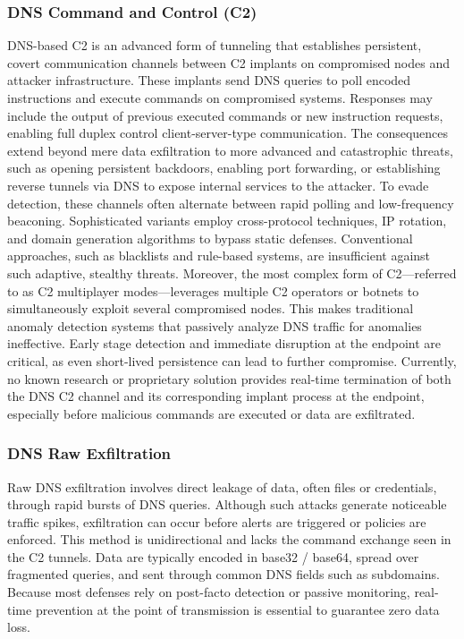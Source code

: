 \documentclass [11pt, proquest] {uwthesis}[2020/02/24]
\begin{document}
\subsubsection{DNS Command and Control (C2)}
DNS-based C2 is an advanced form of tunneling that establishes persistent, covert communication channels between C2 implants on compromised nodes and attacker infrastructure. These implants send DNS queries to poll encoded instructions and execute commands on compromised systems. Responses may include the output of previous executed commands or new instruction requests, enabling full duplex control client-server-type communication. The consequences extend beyond mere data exfiltration to more advanced and catastrophic threats, such as opening persistent backdoors, enabling port forwarding, or establishing reverse tunnels via DNS to expose internal services to the attacker. To evade detection, these channels often alternate between rapid polling and low-frequency beaconing. Sophisticated variants employ cross-protocol techniques, IP rotation, and domain generation algorithms to bypass static defenses. Conventional approaches, such as blacklists and rule-based systems, are insufficient against such adaptive, stealthy threats. Moreover, the most complex form of C2—referred to as C2 multiplayer modes—leverages multiple C2 operators or botnets to simultaneously exploit several compromised nodes. This makes traditional anomaly detection systems that passively analyze DNS traffic for anomalies ineffective. Early stage detection and immediate disruption at the endpoint are critical, as even short-lived persistence can lead to further compromise. Currently, no known research or proprietary solution provides real-time termination of both the DNS C2 channel and its corresponding implant process at the endpoint, especially before malicious commands are executed or data are exfiltrated.


\subsubsection{DNS Raw Exfiltration}
Raw DNS exfiltration involves direct leakage of data, often files or credentials, through rapid bursts of DNS queries. Although such attacks generate noticeable traffic spikes, exfiltration can occur before alerts are triggered or policies are enforced.
This method is unidirectional and lacks the command exchange seen in the C2 tunnels. Data are typically encoded in base32 / base64, spread over fragmented queries, and sent through common DNS fields such as subdomains. Because most defenses rely on post-facto detection or passive monitoring, real-time prevention at the point of transmission is essential to guarantee zero data loss.
\end{document}

